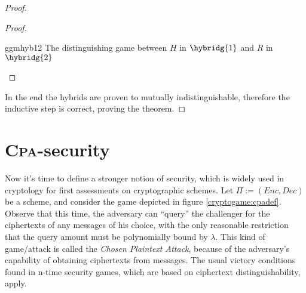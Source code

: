 \begin{proof}
\begin{proof}
        \begin{cryptogame}
            {ggmhyb12}
            {The distinguishing game between $H$ in $\hybridg{1}$ and $R$ in $\hybridg{2}$}
            {}


            \cseqdelay


            \cseqdelay


            \cseqdelay


        \end{cryptogame}
        
    \end{proof}

    In the end the hybrids are proven to mutually indistinguishable, therefore the inductive step is correct, proving the theorem.

\end{proof}

\section{\textsc{Cpa}-security}

Now it's time to define a stronger notion of security, which is widely used in cryptology for first assessments on cryptographic schemes. Let $\Pi := (Enc, Dec)$ be a \ske{} scheme, and consider the game depicted in figure \ref{cryptogame:cpadef}. Observe that this time, the adversary can ``query'' the challenger for the ciphertexts of any messages of his choice, with the only reasonable restriction that the query amount must be polynomially bound by $\lambda$. This kind of game/attack is called the \emph{Chosen Plaintext Attack}, because of the adversary's capability of obtaining ciphertexts from messages. The usual victory conditions found in n-time security games, which are based on ciphertext distinguishability, apply.

